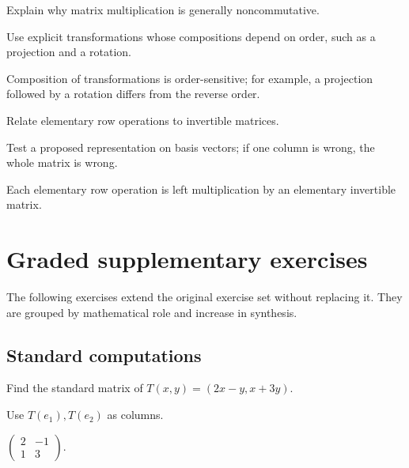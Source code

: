 \begin{exercise}\label{exr:i07-07}
Explain why matrix multiplication is generally noncommutative.
\end{exercise}
\begin{hint}
Use explicit transformations whose compositions depend on order, such as a projection and a rotation.
\end{hint}
\begin{solution}
Composition of transformations is order-sensitive; for example, a projection followed by a rotation differs from the reverse order.
\end{solution}

\begin{exercise}\label{exr:i07-08}
Relate elementary row operations to invertible matrices.
\end{exercise}
\begin{hint}
Test a proposed representation on basis vectors; if one column is wrong, the whole matrix is wrong.
\end{hint}
\begin{solution}
Each elementary row operation is left multiplication by an elementary invertible matrix.
\end{solution}


\section{Graded supplementary exercises}
The following exercises extend the original exercise set without replacing it. They are grouped by mathematical role and increase in synthesis.

\subsection*{Standard computations}

\begin{exercise}\label{exr:i07-expand-01}
Find the standard matrix of \(T(x,y)=(2x-y,x+3y)\).
\end{exercise}
\begin{hint}
Use \(T(e_1),T(e_2)\) as columns.
\end{hint}
\begin{solution}
\(\begin{pmatrix}2&-1\\1&3\end{pmatrix}\).
\end{solution}

